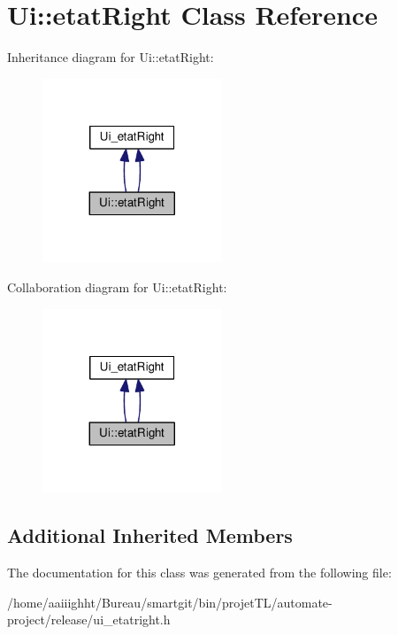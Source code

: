 \hypertarget{class_ui_1_1etat_right}{\section{Ui\-:\-:etat\-Right Class Reference}
\label{class_ui_1_1etat_right}
}


Inheritance diagram for Ui\-:\-:etat\-Right\-:
\nopagebreak
\begin{figure}[H]
\begin{center}
\leavevmode
\includegraphics[width=152pt]{class_ui_1_1etat_right__inherit__graph}
\end{center}
\end{figure}


Collaboration diagram for Ui\-:\-:etat\-Right\-:
\nopagebreak
\begin{figure}[H]
\begin{center}
\leavevmode
\includegraphics[width=152pt]{class_ui_1_1etat_right__coll__graph}
\end{center}
\end{figure}
\subsection*{Additional Inherited Members}


The documentation for this class was generated from the following file\-:\begin{DoxyCompactItemize}
\item 
/home/aaiiighht/\-Bureau/smartgit/bin/projet\-T\-L/automate-\/project/release/ui\-\_\-etatright.\-h\end{DoxyCompactItemize}
